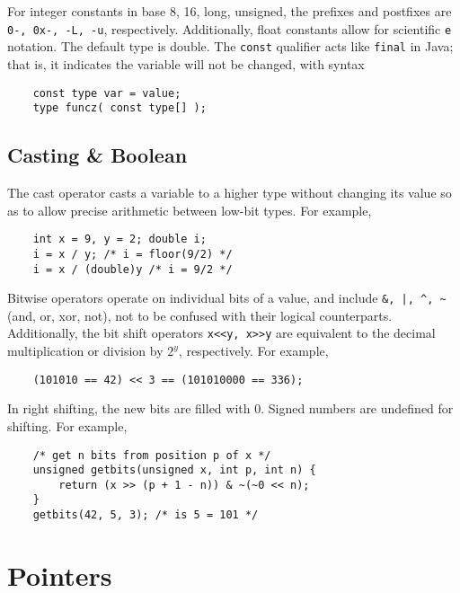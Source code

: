 \documentclass{tufte-book}
\begin{document}
\begin{fullwidth}
\bigskip
For integer constants in base 8, 16, long, unsigned, the prefixes and postfixes are \lstinline{0-, 0x-, -L, -u}, respectively. Additionally, float constants allow for scientific \lstinline{e} notation. The default type is double. The \lstinline{const} qualifier acts like \lstinline{final} in Java; that is, it indicates the variable will not be changed, with syntax
\begin{lstlisting}
    const type var = value;
    type funcz( const type[] );
\end{lstlisting}

\section{Casting \& Boolean}
The cast operator casts a variable to a higher type without changing its value so as to allow precise arithmetic between low-bit types. For example,
\begin{lstlisting}
    int x = 9, y = 2; double i;
    i = x / y; /* i = floor(9/2) */
    i = x / (double)y /* i = 9/2 */
\end{lstlisting}
Bitwise operators operate on individual bits of a value, and include \lstinline{&, |, ^, ~} (and, or, xor, not), not to be confused with their logical counterparts. Additionally, the bit shift operators \lstinline{x<<y, x>>y} are equivalent to the decimal multiplication or division by $2^y$, respectively. For example,
\begin{lstlisting}
    (101010 == 42) << 3 == (101010000 == 336);
\end{lstlisting}
In right shifting, the new bits are filled with 0. Signed numbers are undefined for shifting. For example,
\begin{lstlisting}
    /* get n bits from position p of x */
    unsigned getbits(unsigned x, int p, int n) {
        return (x >> (p + 1 - n)) & ~(~0 << n);
    }
    getbits(42, 5, 3); /* is 5 = 101 */
\end{lstlisting}

\chapter{Pointers}

\end{fullwidth}
\end{document}

